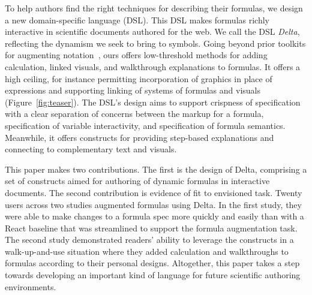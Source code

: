 To help authors find the right techniques for describing their formulas, we design a new domain-specific language (DSL). This DSL makes formulas richly interactive in scientific documents authored for the web. We call the DSL \emph{Delta}, reflecting the dynamism we seek to bring to symbols. Going beyond prior toolkits for augmenting notation~\cite{Wu2023-xc,ref:li2022heartdown,manim3b1b}, ours offers low-threshold methods for adding calculation, linked visuals, and walkthrough explanations to formulas. It offers a high ceiling, for instance permitting incorporation of graphics in place of expressions and supporting linking of systems of formulas and visuals (Figure~\ref{fig:teaser}). The DSL's design aims to support crispness of specification with a clear separation of concerns between the markup for a formula, specification of variable interactivity, and specification of formula semantics. Meanwhile, it offers constructs for providing step-based explanations and connecting to complementary text and visuals.

This paper makes two contributions. The first is the design of Delta, comprising a set of constructs aimed for authoring of dynamic formulas in interactive documents. The second contribution is evidence of fit to envisioned task. Twenty users across two studies augmented formulas using Delta. In the first study, they were able to make changes to a formula spec more quickly and easily than with a React baseline that was  streamlined to support the formula augmentation task. The second study demonstrated readers' ability to leverage the constructs in a walk-up-and-use situation where they added calculation and walkthroughs to formulas according to their personal designs. Altogether, this paper takes a step towards developing an important kind of language for future scientific authoring environments.